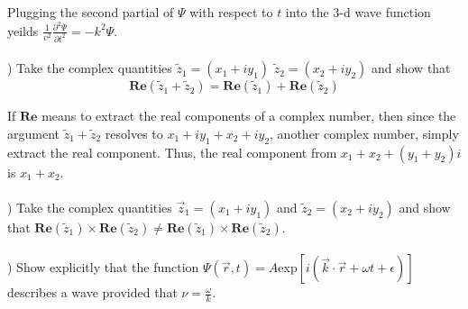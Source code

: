 \documentclass[12pt]{article}
\begin{document}
\noindent Plugging the second partial of $\Psi$ with respect to $t$ 
into the 3-d wave function yeilds 
$\frac{1}{v^{2}}\frac{\partial ^{2} \Psi}{\partial t^{2}} = -k^{2}\Psi$.\\\\


) Take the complex quantities $\tilde{z}_{1} = (x_{1}+iy_{1})$
$\tilde{z}_{2} = (x_{2}+iy_{2})$ and show that \\ 
\[\mathbf{Re}(\tilde{z}_{1} + \tilde{z}_{2}) 
= \mathbf{Re}(\tilde{z}_{1}) + \mathbf{Re}(\tilde{z}_{2})\]

\noindent If $\mathbf{Re}$ means to extract the real components of a complex number, then 
since the argument $\tilde{z}_{1} + \tilde{z}_{2}$ resolves to 
$x_{1} + iy_{1} + x_{2} + iy_{2}$, another complex number, simply extract the real component. Thus, the real component from $x_{1} + x_{2} + (y_{1} + y_{2})i$ is 
$x_{1} + x_{2}$.\\\\



) Take the complex quantities $\vec{z}_{1} = (x_{1} + iy_{1})$
and $\tilde{z}_{2} = (x_{2}+iy_{2})$ and show that 
$\mathbf{Re}(\tilde{z}_{1}) \times \mathbf{Re}(\tilde{z}_{2})
\neq \mathbf{Re}(\tilde{z}_{1}) \times \mathbf{Re}(\tilde{z}_{2})$.\\\\


) Show explicitly that the function 
$\Psi(\vec{r}, t) = A$exp$[i(\vec{k}\cdot\vec{r} + \omega t + \epsilon)]$
describes a wave provided that $\nu = \frac{\omega}{k}$.\\\\

\pagebreak
\end{document}
